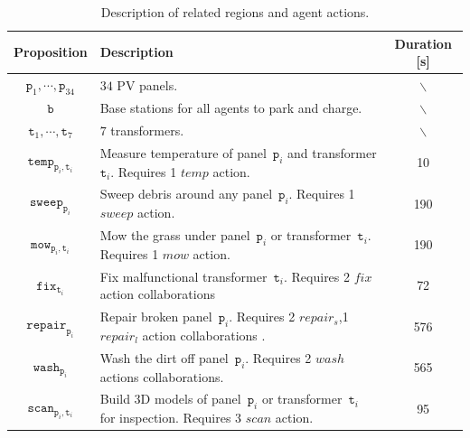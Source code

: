 \begin{table}[t]
 \centering
\caption{Description of related regions and agent actions.}
\label{fig:symbols}
\begin{tabular}{|c|m{}|c|}\hline
\textbf{Proposition} & \textbf{Description}\centering & \textbf{Duration} [s]\\ \hline
$\texttt{p}_1,\cdots,\texttt{p}_{34}$ & $34$ PV panels. & $\backslash$ \\ \hline
$\texttt{b}$ & Base stations for all agents to park and charge. & $\backslash$ \\ \hline
$\texttt{t}_1,\cdots,\texttt{t}_7$ & $7$ transformers. & $\backslash$ \\ \hline
$\texttt{temp}_{\texttt{p}_i,\texttt{t}_i}$ &
Measure temperature of panel~$\texttt{p}_i$ and transformer $\texttt{t}_i$.
Requires 1 $temp$ action. & 10 \\ \hline
$\texttt{sweep}_{\texttt{p}_i}$& Sweep debris around any panel~$\texttt{p}_i$.
Requires 1 $sweep$ action. & 190\\ \hline
$\texttt{mow}_{\texttt{p}_i,\texttt{t}_i}$ &
Mow the grass under panel~$\texttt{p}_i$ or transformer~$\texttt{t}_i$.
Requires 1 $mow$ action. & 190\\ \hline
$\texttt{fix}_{\texttt{t}_i}$ &
Fix malfunctional transformer~$\texttt{t}_i$.
Requires 2 $fix$ action collaborations & 72\\ \hline
$\texttt{repair}_{\texttt{p}_i}$ &
Repair broken panel~$\texttt{p}_i$.
Requires 2 $repair_s$,1 $repair_l$ action collaborations . & 576\\ \hline
$\texttt{wash}_{\texttt{p}_i}$ &
Wash the dirt off panel~$\texttt{p}_i$.
Requires 2 $wash$ actions collaborations. & 565\\ \hline
$\texttt{scan}_{\texttt{p}_i,\texttt{t}_i}$ &
Build 3D models of panel~$\texttt{p}_i$ or transformer~$\texttt{t}_i$
for inspection. Requires 3 $scan$ action. & 95\\ \hline
\end{tabular}
\end{table}


